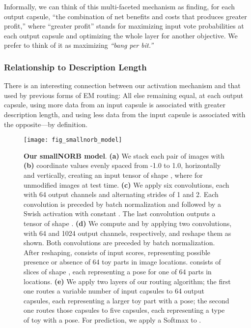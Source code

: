 \documentclass[11pt,a4paper]{article}
\begin{document}
Informally, we can think of this multi-faceted mechanism as finding, for each output capsule, ``the combination of net benefits and costs that produces greater profit,'' where ``greater profit'' stands for maximizing input vote probabilities at each output capsule and optimizing the whole layer for another objective. We prefer to think of it as maximizing \emph{``bang per bit.''}

\subsubsection{Relationship to Description Length}

There is an interesting connection between our activation mechanism and that used by previous forms of EM routing: All else remaining equal, at each output capsule, using more data from an input capsule is associated with greater description length, and using less data from the input capsule is associated with the opposite---by definition.


\begin{figure*}[t]
	\vskip 0.1in
	\begin{center}
		\centerline{\texttt{[image: fig\_smallnorb\_model]}}
		\caption{\textbf{Our smallNORB model}. \textbf{(a)} We stack each pair of images with \textbf{(b)} coordinate values evenly spaced from -1.0 to 1.0, horizontally and vertically, creating an input tensor of shape , where  for unmodified images at test time. \textbf{(c)} We apply six  convolutions, each with 64 output channels and alternating strides of 1 and 2. Each convolution is preceded by batch normalization and followed by a Swish activation \cite{DBLP:journals/corr/abs-1710-05941} with constant . The last convolution outputs a tensor of shape . \textbf{(d)} We compute  and  by applying two  convolutions, with 64 and 1024 output channels, respectively, and reshape them as shown. Both convolutions are preceded by batch normalization. After reshaping,  consists of  input scores, representing possible presence or absence of 64 toy parts in  image locations.  consists of  slices of shape , each representing a pose for one of 64 parts in  locations. \textbf{(e)} We apply two layers of our routing algorithm; the first one routes a variable number of input capsules to 64 output capsules, each representing a larger toy part with a  pose; the second one routes those capsules to five capsules, each representing a type of toy with a  pose. For prediction, we apply a Softmax to .}
		\label{fig:smallnorb_model}
	\end{center}
	\vskip -0.2in
\end{figure*} 
\end{document}
